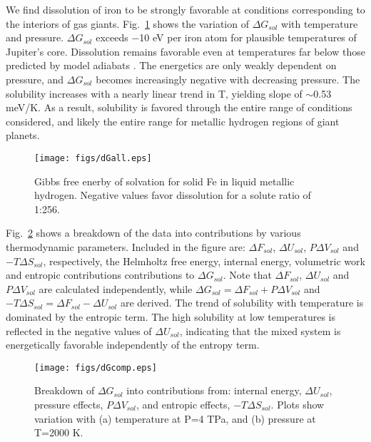 We find dissolution of iron to be strongly favorable at conditions corresponding to
the interiors of gas giants. Fig.~\ref{fig:dGall}  shows the variation of $\Delta G_{sol}$
with temperature and pressure. $\Delta G_{sol}$ exceeds $-$10 eV per iron atom for
plausible temperatures of Jupiter's core. Dissolution remains favorable even
at temperatures far below those predicted by model adiabats
\citep{militzer13,militzer13b}. The energetics
are only weakly dependent on pressure, and  $\Delta G_{sol}$ becomes increasingly
negative with decreasing pressure. The solubility increases with a nearly
linear trend in T, 
yielding slope of $\sim$0.53 meV/K. As a result, solubility is favored
through the entire range of conditions considered, and likely the entire range
for metallic hydrogen regions of giant planets.

 \begin{figure}[!h] %
   \centering
   \texttt{[image: figs/dGall.eps]} 
\caption{Gibbs free enerby of solvation for solid Fe in liquid metallic
    hydrogen. Negative values favor dissolution for a solute ratio of 1:256. \label{fig:dGall}}
\end{figure}

Fig.~\ref{fig:dGcomp} shows a breakdown of the data into contributions by various
thermodynamic parameters. Included in the figure are: $\Delta F_{sol}$, $\Delta U_{sol}$,
$P\Delta V_{sol}$ and $-T\Delta S_{sol}$, respectively, the Helmholtz free energy, internal
energy, volumetric work and entropic contributions contributions to $\Delta
G_{sol}$. Note that $\Delta F_{sol}$, $\Delta U_{sol}$ and $P\Delta V_{sol}$
are calculated independently, while $\Delta G_{sol}=\Delta F_{sol}+P\Delta
V_{sol}$ and $-T\Delta S_{sol}=\Delta F_{sol}-\Delta U_{sol}$ are derived. 
The trend of solubility with temperature is dominated by the entropic term.
The high solubility at low temperatures is
reflected in the negative values of $\Delta U_{sol}$, indicating that the
mixed system is energetically favorable independently of the entropy term. 

 \begin{figure}[!h] %
   \centering
   \texttt{[image: figs/dGcomp.eps]} 
\caption{Breakdown of $\Delta G_{sol}$ into contributions from: internal
energy,
$\Delta U_{sol}$, pressure effects, $P\Delta V_{sol}$, and entropic effects,
$-T\Delta S_{sol}$. Plots show variation with (a) temperature at P=4 TPa, and
(b) pressure at T=2000 K. \label{fig:dGcomp}}
\end{figure}

